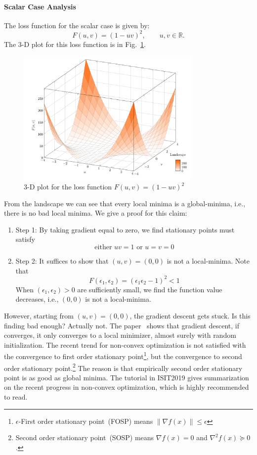 \paragraph{Scalar Case Analysis}
The loss function for the scalar case is given by:
\[
F(u,v) = (1-uv)^2,\qquad u,v\in\mathbb{R}.
\]
The 3-D plot for this loss function is in Fig.~\ref{fig:5:2}.
\begin{figure}[H]
\centering
\includegraphics[width=0.8\textwidth]{Fifth_lecture/f_2.pdf}
\caption{$3$-D plot for the loss function $F(u,v) = (1-uv)^2$}
\label{fig:5:2}
\end{figure}
From the landscape we can see that every local minima is a global-minima, i.e., there is no bad local minima.
We give a proof for this claim:
\begin{enumerate}
\item
Step 1: By taking gradient equal to zero, we find stationary points must satisfy
\[
\text{either $uv=1$ or $u=v=0$}
\]
\item
Step 2: It suffices to show that $(u,v) = (0,0)$ is not a local-minima. Note that 
\[
F(\epsilon_1,\epsilon_2) = (\epsilon_1\epsilon_2-1)^2<1
\]
When $(\epsilon_1,\epsilon_2)>0$ are sufficiently small, we find the function value decreases, i.e., $(0,0)$ is not a local-minima.
\end{enumerate}
\begin{remark}
However, starting from $(u,v)=(0,0)$, the gradient descent gets stuck.
Is this finding bad enough? 
Actually not. The paper~\citep{pmlr-v49-lee16} shows that gradient descent, if converges, it only converges to a local minimizer, almost surely with random initialization.
The recent trend for non-convex optimization is not satisfied with the convergence to first order stationary point\footnote{$\epsilon$-First order stationary point~(FOSP) means $\|\nabla f(x)\|\le\epsilon$}, but the convergence to second order stationary point.\footnote{Second order stationary point~(SOSP) means $\nabla f(x)=0$ and $\nabla^2f(x)\succeq0$.}
The reason is that empirically second order stationary point is as good as global minima.
The tutorial \citep{ISIT2019} in ISIT2019
gives summarization on the recent progress in non-convex optimization, which is highly recommended to read.
\end{remark}


